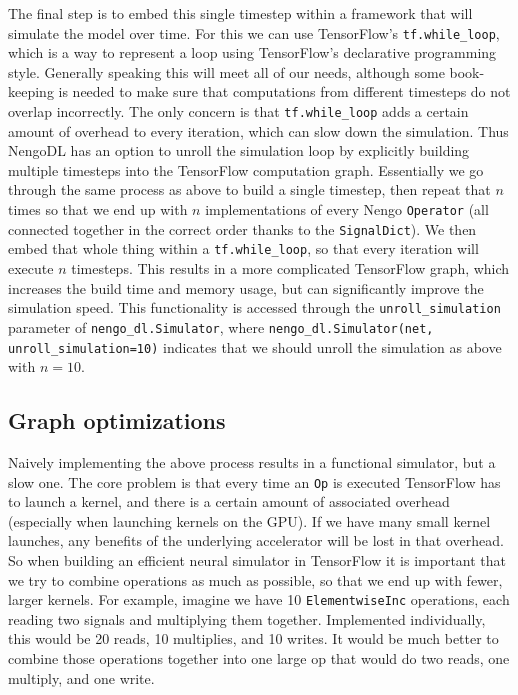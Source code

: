 \documentclass{article}
\begin{document}
The final step is to embed this single timestep within a framework that will simulate the model over time.  For this we can use TensorFlow's \texttt{tf.while\_loop}, which is a way to represent a loop using TensorFlow's declarative programming style.  Generally speaking this will meet all of our needs, although some book-keeping is needed to make sure that computations from different timesteps do not overlap incorrectly.  The only concern is that \texttt{tf.while\_loop} adds a certain amount of overhead to every iteration, which can slow down the simulation.  Thus NengoDL has an option to unroll the simulation loop by explicitly building multiple timesteps into the TensorFlow computation graph.  Essentially we go through the same process as above to build a single timestep, then repeat that $n$ times so that we end up with $n$ implementations of every Nengo \texttt{Operator} (all connected together in the correct order thanks to the \texttt{SignalDict}).  We then embed that whole thing within a \texttt{tf.while\_loop}, so that every iteration will execute $n$ timesteps.  This results in a more complicated TensorFlow graph, which increases the build time and memory usage, but can significantly improve the simulation speed.  This functionality is accessed through the \texttt{unroll\_simulation} parameter of \texttt{nengo\_dl.Simulator}, where \texttt{nengo\_dl.Simulator(net, unroll\_simulation=10)} indicates that we should unroll the simulation as above with $n=10$.

\subsection{Graph optimizations}
\label{sec:graphoptimizations}

Naively implementing the above process results in a functional simulator, but a slow one.  The core problem is that every time an \texttt{Op} is executed TensorFlow has to launch a kernel, and there is a certain amount of associated overhead (especially when launching kernels on the GPU).  If we have many small kernel launches, any benefits of the underlying accelerator will be lost in that overhead.  So when building an efficient neural simulator in TensorFlow it is important that we try to combine operations as much as possible, so that we end up with fewer, larger kernels.  For example, imagine we have 10 \texttt{ElementwiseInc} operations, each reading two signals and multiplying them together.  Implemented individually, this would be 20 reads, 10 multiplies, and 10 writes.  It would be much better to combine those operations together into one large op that would do two reads, one multiply, and one write.
\end{document}
